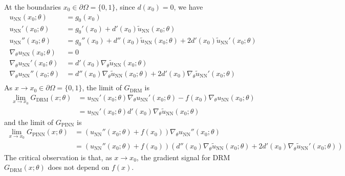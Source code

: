 \documentclass{article}
\begin{document}
At the boundaries $x_0 \in \partial \Omega = \{0,1\}$, since $d(x_0)=0$, we have
\begin{equation}
    \begin{split}
        u_{\text{NN}}(x_0;\theta) & = g_0(x_0) \\
        u_{\text{NN}}'(x_0;\theta) & = g_0'(x_0) + d'(x_0) \widetilde{u}_{\text{NN}}(x_0;\theta) \\
        u_{\text{NN}}''(x_0;\theta) & = g_0''(x_0) + d''(x_0) \widetilde{u}_{\text{NN}}(x_0;\theta) + 2d'(x_0) \widetilde{u}_{\text{NN}}'(x_0;\theta) \\
        \nabla_\theta u_{\text{NN}}(x_0;\theta) & = 0 \\
        \nabla_\theta u_{\text{NN}}'(x_0;\theta) & = d'(x_0) \nabla_\theta \widetilde{u}_{\text{NN}}(x_0;\theta) \\
        \nabla_\theta u_{\text{NN}}''(x_0;\theta) & = d''(x_0) \nabla_\theta \widetilde{u}_{\text{NN}}(x_0;\theta) + 2d'(x_0) \nabla_\theta \widetilde{u}_{\text{NN}}'(x_0;\theta) \\
    \end{split}
\end{equation}
As $x \to x_0 \in \partial \Omega = \{0,1\}$, the limit of $G_{\text{DRM}}$ is
\begin{equation}
    \begin{split}
        \lim_{x \to x_0} G_{\text{DRM}}(x; \theta)
        & = u_{\text{NN}}'(x_0; \theta) \nabla_{\theta} u_{\text{NN}}'(x_0; \theta) - f(x_0) \nabla_{\theta} u_{\text{NN}}(x_0; \theta) \\
        & = u_{\text{NN}}'(x_0; \theta) d'(x_0) \nabla_\theta \widetilde{u}_{\text{NN}}(x_0;\theta)
    \end{split}
\end{equation}
and the limit of $G_{\text{PINN}}$ is
\begin{equation}
    \begin{split}
        \lim_{x \to x_0} G_{\text{PINN}}(x; \theta)
        & = (u_{\text{NN}}''(x_0; \theta) + f(x_0)) \nabla_{\theta} u_{\text{NN}}''(x_0; \theta) \\
        & = (u_{\text{NN}}''(x_0; \theta) + f(x_0))  (d''(x_0) \nabla_\theta \widetilde{u}_{\text{NN}}(x_0;\theta) + 2d'(x_0) \nabla_\theta \widetilde{u}_{\text{NN}}'(x_0;\theta))
    \end{split}
\end{equation}
The critical observation is that, as $x \to x_0$, the gradient signal for DRM $G_{\text{DRM}}(x; \theta)$ does not depend on  $f(x)$. 
\end{document}
